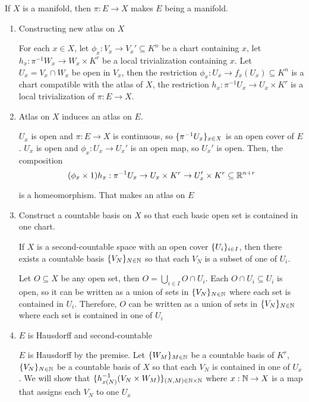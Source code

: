 \begin{proposition}
	If $X$ is a manifold, then $\pi: E \to X$ makes $E$ being a manifold.
	\begin{longproof}
		\begin{enumerate}
			\item Constructing new atlas on $X$
			
			For each $x \in X$, let $\phi_x: V_x \to V_x' \subseteq K^n$ be a chart containing $x$, let $h_x: \pi^{-1} W_x \to W_x \times K^r$ be a local trivialization containing $x$. Let $U_x = V_x \cap W_x$ be open in $V_x$, then the restriction $\phi_x: U_x \to f_x(U_x) \subseteq K^n$ is a chart compatible with the atlas of $X$, the restriction $h_x: \pi^{-1} U_x \to U_x \times K^r$ is a local trivialization of $\pi: E \to X$.
			
			\item Atlas on $X$ induces an atlas on $E$.
			
			$U_x$ is open and $\pi: E \to X$ is continuous, so $\{\pi^{-1} U_x\}_{x \in X}$ is an open cover of $E$. $U_x$ is open and $\phi_x: U_x \to U_x'$ is an open map, so $U_x'$ is open. Then, the composition 
			$$
			(\phi_x \times 1) h_x: \pi^{-1} U_x \to U_x \times K^r \to U_x' \times K^r \subseteq \mathbb{R}^{n+r}
			$$
			
			is a homeomorphism. That makes an atlas on $E$
			
			\item Construct a countable basis on $X$ so that each basic open set is contained in one chart.
			\begin{lemma}
				If $X$ is a second-countable space with an open cover $\{U_i\}_{i \in I}$, then there exists a countable basis $\{V_N\}_{N \in \mathbb{N}}$ so that each $V_N$ is a subset of one of $U_i$.
			\end{lemma}
			
			Let $O \subseteq X$ be any open set, then $O = \bigcup_{i \in I} O \cap U_i$. Each $O \cap U_i \subseteq U_i$ is open, so it can be written as a union of sets in $\{V_N\}_{N \in \mathbb{N}}$ where each set is contained in $U_i$. Therefore, $O$ can be written as a union of sets in $\{V_N\}_{N \in \mathbb{N}}$ where each set is contained in one of $U_i$
			
			\item $E$ is Hausdorff and second-countable
			
			$E$ is Hausdorff by the premise. Let $\{W_M\}_{M \in \mathbb{N}}$ be a countable basis of $K^r$, $\{V_N\}_{N \in \mathbb{N}}$ be a countable basis of $X$ so that each $V_N$ is contained in one of $U_x$. We will show that $\{h^{-1}_{x(N)} (V_N \times W_M)\}_{(N, M) \in \mathbb{N} \times \mathbb{N}}$ where $x: \mathbb{N} \to X$ is a map that assigns each $V_N$ to one $U_x$
			

\end{enumerate}
\end{longproof}
\end{proposition}
